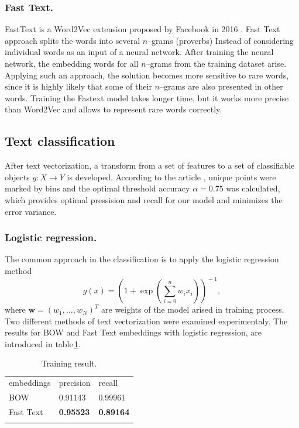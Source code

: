 \documentclass[12pt]{jpconf}
\begin{document}
\subsubsection*{Fast Text.}
FastText is a Word2Vec extension proposed by Facebook in 2016 \cite{Mikolov2013,Bojanowski2017}. Fast Text approach splits the words into several $n$--grams (proverbs) Instead of considering individual words as an input of a neural network. After training the neural network, the embedding words for all $n$--grams from the training dataset arise.
Applying such an approach, the solution becomes more sensitive to rare words, since it is highly likely that some of their $n$--grams are also presented in other words. Training the Fastext model takes longer time, but it works more precise than Word2Vec and allows to  represent rare words correctly.

\subsection{Text classification}
After text vectorization, a transform from a set of features to a set of classifiable objects $g: X \rightarrow Y$ is developed.
According to the article \cite{Bommannavar2014,Yang2014}, unique points were marked by bins and the optimal threshold accuracy $\alpha = 0.75$ was calculated, which provides optimal pressision and recall for our model and minimizes the error variance.

\subsubsection*{Logistic regression.}
The common approach in the classification is to apply the logistic regression method
$$
g(x) = \left(1 + \exp{ \left( \sum_{i=0}^n w_i x_i  \right) }\right)^{\!\!-1}\!\!\!\!,
$$
where $\mathbf{w}=(w_1,\ldots, w_N)^T$ are weights of the model arised in training process.
Two different methods of text vectorization were examined experimentaly.
The results for BOW and Fast Text embeddings with logistic regression, are introduced in table\,\ref{tbl:01}.

\begin{table}[h!]
	\centering
	\caption{\label{tbl:01}Training result.}
	\begin{center}
		\begin{tabular}{lll}
			\br
			embeddings & precision & recall \\
			\mr
			BOW & 0.91143 & 0.99961 \\ \hline
			Fast Text & \bf 0.95523 & \bf 0.89164 \\ 
			\br
		\end{tabular}
	\end{center}
\end{table}
\end{document}
